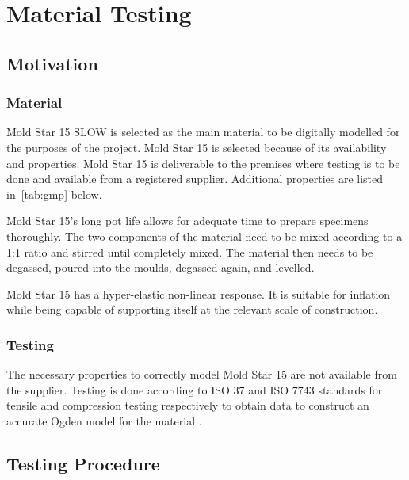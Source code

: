 \chapter{Material Testing}
\label{chp:MT}

\section{Motivation}

\subsection{Material}

Mold Star 15 SLOW is selected as the main material to be digitally modelled for the purposes of the project. Mold Star 15 is selected because of its availability and properties. Mold Star 15 is deliverable to the premises where testing is to be done and available from a registered supplier. Additional properties are listed in~\ref{tab:gmp} below.

\begin{table}[h]
	\centering
	\caption{Given Material Properties \cite{MoldStar}}
	\label{tab:gmp}
\end{table}

Mold Star 15's long pot life allows for adequate time to prepare specimens thoroughly. The two components of the material need to be mixed according to a 1:1 ratio and stirred until completely mixed. The material then needs to be degassed, poured into the moulds, degassed again, and levelled.

Mold Star 15 has a hyper-elastic non-linear response. It is suitable for inflation while being capable of supporting itself at the relevant scale of construction.

\subsection{Testing}

The necessary properties to correctly model Mold Star 15 are not available from the supplier. Testing is done according to ISO 37 and ISO 7743 standards for tensile and compression testing respectively to obtain data to construct an accurate Ogden model for the material \cite{ISO37,ISO7743}.

\section{Testing Procedure}
